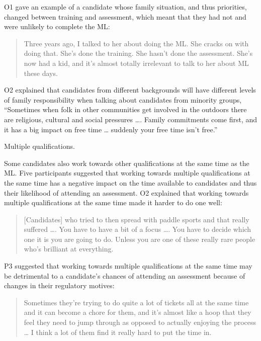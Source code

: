 \documentclass[a4paper,]{book}
\begin{document}
O1 gave an example of a candidate whose family situation, and thus priorities, changed between training and assessment, which meant that they had not and were unlikely to complete the ML:

\begin{quote}
Three years ago, I talked to her about doing the ML. She cracks on with doing that. She's done the training. She hasn't done the assessment. She's now had a kid, and it's almost totally irrelevant to talk to her about ML these days.
\end{quote}

O2 explained that candidates from different backgrounds will have different levels of family responsibility when talking about candidates from minority groups, ``Sometimes when folk in other communities get involved in the outdoors there are religious, cultural and social pressures \ldots{}. Family commitments come first, and it has a big impact on free time \ldots{} suddenly your free time isn't free.''

Multiple qualifications.

Some candidates also work towards other qualifications at the same time as the ML. Five participants suggested that working towards multiple qualifications at the same time has a negative impact on the time available to candidates and thus their likelihood of attending an assessment. O2 explained that working towards multiple qualifications at the same time made it harder to do one well:

\begin{quote}
{[}Candidates{]} who tried to then spread with paddle sports and that really suffered \ldots{}. You have to have a bit of a focus \ldots{}. You have to decide which one it is you are going to do. Unless you are one of these really rare people who's brilliant at everything.
\end{quote}

P3 suggested that working towards multiple qualifications at the same time may be detrimental to a candidate's chances of attending an assessment because of changes in their regulatory motives:

\begin{quote}
Sometimes they're trying to do quite a lot of tickets all at the same time and it can become a chore for them, and it's almost like a hoop that they feel they need to jump through as opposed to actually enjoying the process \ldots{} I think a lot of them find it really hard to put the time in.
\end{quote}
\end{document}
